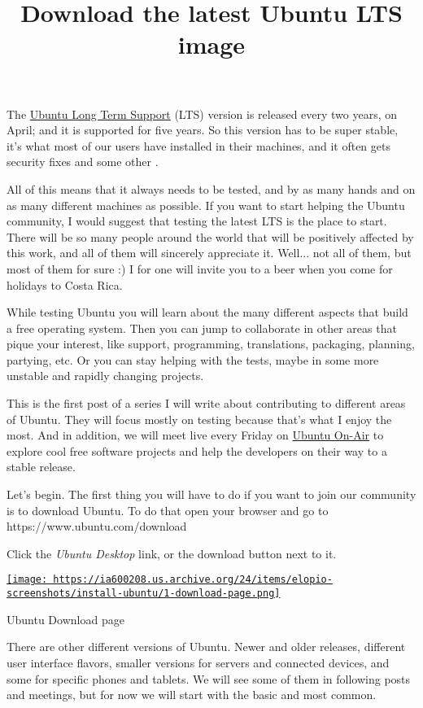 \documentclass[12pt]{article}
\title{Download the latest Ubuntu LTS image}
\begin{document}
The \href{https://wiki.ubuntu.com/LTS}{Ubuntu Long Term Support} (LTS) version
is released every two years, on April; and it is supported for five years. So
this version has to be super stable, it's what most of our users have installed
in their machines, and it often gets security fixes and some other
.

All of this means that it always needs to be tested, and by as many hands and on
as many different machines as possible. If you want to start helping the Ubuntu
community, I would suggest that testing the latest LTS is the place to start.
There will be so many people around the world that will be positively affected
by this work, and all of them will sincerely appreciate it. Well... not all of
them, but most of them for sure :) I for one will invite you to a beer when you
come for holidays to Costa Rica.

While testing Ubuntu you will learn about the many different aspects that build
a free operating system. Then you can jump to collaborate in other areas that
pique your interest, like support, programming, translations, packaging,
planning, partying, etc. Or you can stay helping with the tests, maybe in some
more unstable and rapidly changing projects.

This is the first post of a series I will write about contributing to different
areas of Ubuntu. They will focus mostly on testing because that's what I enjoy
the most. And in addition, we will meet live every Friday on
\href{http://ubuntuonair.com/}{Ubuntu On-Air} to explore cool free software
projects and help the developers on their way to a stable release.

Let's begin. The first thing you will have to do if you want to join our
community is to download Ubuntu. To do that open your browser and go to
https://www.ubuntu.com/download

Click the \emph{Ubuntu Desktop} link, or the download button next to it.

\begin{center}
  \href{
    https://ia600208.us.archive.org/24/items/elopio-screenshots/install-ubuntu/1-download-page.png}{
    \texttt{[image: 
    https://ia600208.us.archive.org/24/items/elopio-screenshots/install-ubuntu/1-download-page.png]}
  }
  \caption{Ubuntu Download page}
\end{center}

There are other different versions of Ubuntu. Newer and older releases,
different user interface flavors, smaller versions for servers and connected
devices, and some for specific phones and tablets. We will see some of them
in following posts and meetings, but for now we will start with the basic and
most common.
\end{document}
